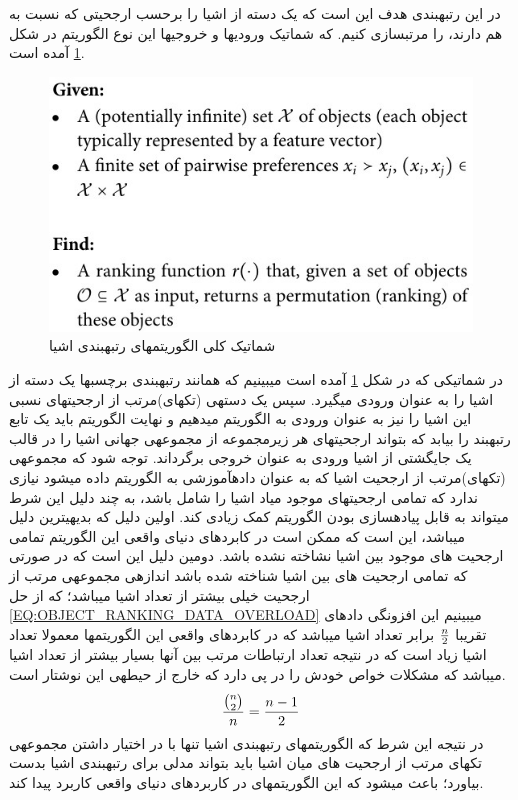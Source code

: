 \documentclass[journal]{IEEEtran}
\newcommand{\نیمفاصله}{\halfspace}
\renewcommand{\ }{\halfspace}
\renewcommand{\یا}{یادگیری\ ارجحیت }
\newcommand{\یم}{یادگیری\ ماشین }
\renewcommand{\تر}{تابع رتبه\ بند }
\newcommand{\ار}{ارجحیت }
\renewcommand{\|}[1][.3em]{\hspace{#1}|\hspace{#1}}
\renewcommand{\,}[1][.3em]{,\hspace{#1}}
\begin{document}
\زیرزیرقسمت{رتبه\ بندی اشیا}
\label{SEC:OBJECT_RANKING}
در این رتبه\ بندی هدف این است که یک دسته از اشیا را برحسب ارجحیتی که نسبت به هم دارند، را مرتب\ سازی کنیم. که شماتیک ورودی\ ها و خروجی\ ها این نوع الگوریتم در شکل
\ref{FIG:OBJECT_RANKING_SCHEMA}
آمده است.
\begin{figure}[H]
    \centering
    \includegraphics[width=.4\textwidth]{object-ranking}
    \caption{شماتیک کلی الگوریتم\ های رتبه\ بندی اشیا}\label{FIG:OBJECT_RANKING_SCHEMA}
\end{figure}
در شماتیکی که در شکل
\ref{FIG:OBJECT_RANKING_SCHEMA}
آمده است می\ بینیم که همانند رتبه\ بندی برچسب\ ها یک دسته از اشیا را به عنوان ورودی می\ گیرد. سپس یک دسته\ ی (تکه\ ای)مرتب از ارجحیت\ های نسبی این اشیا را نیز به عنوان ورودی به الگوریتم می\ دهیم و نهایت الگوریتم باید یک \تر را بیابد که بتواند ارجحیت\ های هر زیرمجموعه از مجموعه\ ی جهانی اشیا را در قالب یک جایگشتی از اشیا ورودی به عنوان خروجی برگرداند.
توجه شود که مجموعه\ ی (تکه\ ای)مرتب از ارجحیت اشیا که به عنوان داده\ آموزشی به الگوریتم داده می\ شود نیازی ندارد که تمامی ارجحیت\ های موجود میاد اشیا را شامل باشد، به چند دلیل این شرط می\ تواند به قابل پیاده\ سازی بودن الگوریتم کمک زیادی کند. اولین دلیل که بدیهی\ ترین دلیل می\ باشد، این است که ممکن است در کابردهای دنیای واقعی این الگوریتم تمامی \ار های موجود بین اشیا نشاخته نشده باشد. دومین دلیل این است که در صورتی که تمامی \ار های بین اشیا شناخته شده باشد اندازه\ ی مجموعه\ ی مرتب از \ار خیلی بیشتر از تعداد اشیا می\ باشد؛ که از حل
\ref{EQ:OBJECT_RANKING_DATA_OVERLOAD}
می\ بینیم این افزونگی داده\ ای تقریبا $n \over 2$ برابر تعداد اشیا می\ باشد که در کابردهای واقعی این الگوریتم\ ها معمولا تعداد اشیا زیاد است که در نتیجه تعداد ارتباطات مرتب بین آنها بسیار بیشتر از تعداد اشیا می\ باشد که مشکلات خواص خودش را در پی دارد که خارج از حیطه\ ی این نوشتار است.
\begin{equation}\label{EQ:OBJECT_RANKING_DATA_OVERLOAD}
{{n \choose 2} \over n} = {n - 1 \over 2}
\end{equation}
در نتیجه این شرط که الگوریتم\ های رتبه\ بندی اشیا تنها با در اختیار داشتن مجموعه\ ی تکه\ ای مرتب از \ار های میان اشیا باید بتواند مدلی برای رتبه\ بندی اشیا بدست بیاورد؛ باعث می\ شود که این الگوریتم\ های در کاربردهای دنیای واقعی کاربرد پیدا کند.
\end{document}
